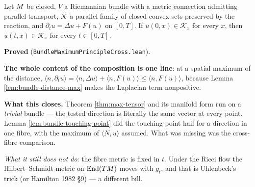 \begin{theorem}
  \label{thm:max-bundle}
  \leanok
  Let $M$ be closed, $V$ a Riemannian bundle with a metric connection admitting parallel
  transport, $\mathcal{K}$ a parallel family of closed convex sets preserved by the reaction,
  and $\partial_t u = \Delta u + F(u)$ on $[0,T]$. If $u(0,x) \in \mathcal{K}_x$ for every $x$,
  then $u(t,x) \in \mathcal{K}_x$ for every $t \in [0,T]$.

  \textbf{Proved} (\texttt{BundleMaximumPrincipleCross.lean}).

  \textbf{The whole content of the composition is one line}: at a spatial maximum of the
  distance, $\langle n, \partial_t u\rangle = \langle n, \Delta u\rangle + \langle n,
  F(u)\rangle \le \langle n, F(u)\rangle$, because Lemma \ref{lem:bundle-distance-max} makes
  the Laplacian term nonpositive.

  \textbf{What this closes.} Theorem \ref{thm:max-tensor} and its manifold form run on a
  \emph{trivial} bundle --- the tested direction is literally the same vector at every point.
  Lemma \ref{lem:bundle-touching-point} did the touching-point half for a direction in one
  fibre, with the maximum of $\langle N,u\rangle$ assumed. What was missing was the
  cross-fibre comparison.

  \emph{What it still does not do}: the fibre metric is fixed in $t$. Under the Ricci flow the
  Hilbert--Schmidt metric on $\operatorname{End}(TM)$ moves with $g_t$, and that is
  Uhlenbeck's trick (or Hamilton 1982 \S 9) --- a different bill.
\end{theorem}

